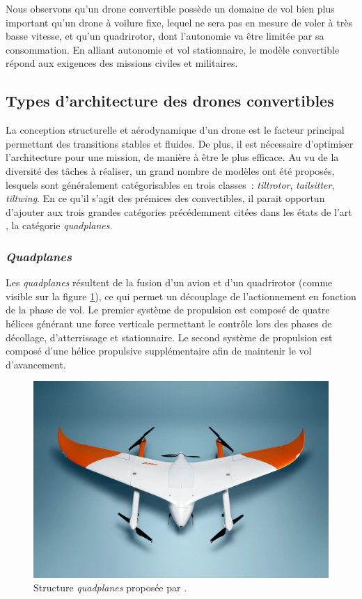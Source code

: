     Nous observons qu'un drone convertible possède un domaine de vol bien plus important qu'un drone à voilure fixe, lequel ne sera pas en mesure de voler à très basse vitesse, et qu'un quadrirotor, dont l'autonomie va être limitée par sa consommation.
    En alliant autonomie et vol stationnaire, le modèle convertible répond aux exigences des missions civiles et militaires.

    \subsection{Types d'architecture des drones convertibles}
    La conception structurelle et aérodynamique d'un drone est le facteur principal permettant des transitions stables et fluides. De plus, il est nécessaire d'optimiser l'architecture pour une mission, de manière à être le plus efficace. Au vu de la diversité des tâches à réaliser, un grand nombre de modèles ont été proposés, lesquels sont généralement catégorisables en trois classes : \textit{tiltrotor}, \textit{tailsitter}, \textit{tiltwing}. 
    En ce qu'il s'agit des prémices des convertibles, il parait opportun d'ajouter aux trois grandes catégories précédemment citées dans les états de l'art \cite{saeed_survey_2018,ducard_review_2021, review_2022}, la catégorie \textit{quadplanes}.

        \subsubsection*{\textit{Quadplanes}}
        Les \textit{quadplanes} résultent de la fusion d'un avion et d'un quadrirotor (comme visible sur la figure \ref{fig:quadplane}), ce qui permet un découplage de l'actionnement en fonction de la phase de vol. Le premier système de propulsion est composé de quatre hélices générant une force verticale permettant le contrôle lors des phases de décollage, d'atterrissage et stationnaire. Le second système de propulsion est composé d'une hélice propulsive supplémentaire afin de maintenir le vol d'avancement.

        \begin{figure}[ht!]
            \centering
                \includegraphics[width=0.6\columnwidth]{figures/Avy-Drone-quadplane.jpg}
                \caption{Structure \textit{quadplanes} proposée par \cite{Avy_2023}.}
                \label{fig:quadplane}
        \end{figure}
        

